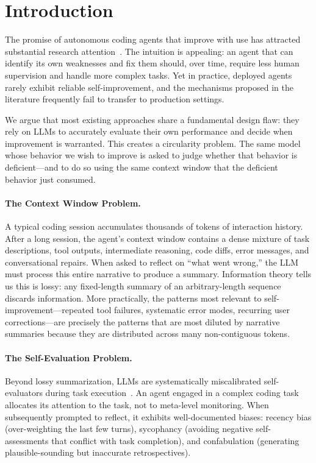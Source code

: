 \section{Introduction}

\label{sec:intro}

The promise of autonomous coding agents that improve with use has attracted
substantial research attention~\cite{shinn2023reflexion, wang2023voyager,
wang2024openhands, wu2023autogen}. The intuition is appealing: an agent that
can identify its own weaknesses and fix them should, over time, require less
human supervision and handle more complex tasks. Yet in practice, deployed
agents rarely exhibit reliable self-improvement, and the mechanisms proposed
in the literature frequently fail to transfer to production settings.

We argue that most existing approaches share a fundamental design flaw: they
rely on LLMs to accurately evaluate their own performance and decide when
improvement is warranted. This creates a circularity problem. The same model
whose behavior we wish to improve is asked to judge whether that behavior is
deficient---and to do so using the same context window that the deficient
behavior just consumed.

\paragraph{The Context Window Problem.}
A typical coding session accumulates thousands of tokens of interaction history.
After a long session, the agent's context window contains a dense mixture of
task descriptions, tool outputs, intermediate reasoning, code diffs, error
messages, and conversational repairs. When asked to reflect on ``what went
wrong,'' the LLM must process this entire narrative to produce a summary.
Information theory tells us this is lossy: any fixed-length summary of an
arbitrary-length sequence discards information. More practically, the
patterns most relevant to self-improvement---repeated tool failures, systematic
error modes, recurring user corrections---are precisely the patterns that
are most diluted by narrative summaries because they are distributed across
many non-contiguous tokens.

\paragraph{The Self-Evaluation Problem.}
Beyond lossy summarization, LLMs are systematically miscalibrated self-evaluators
during task execution~\cite{guo2017calibration, kadavath2022language}. An agent
engaged in a complex coding task allocates its attention to the task, not to
meta-level monitoring. When subsequently prompted to reflect, it exhibits
well-documented biases: recency bias (over-weighting the last few turns),
sycophancy (avoiding negative self-assessments that conflict with task
completion), and confabulation (generating plausible-sounding but inaccurate
retrospectives).

